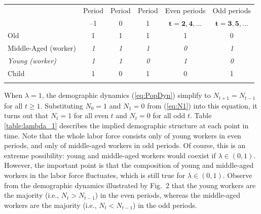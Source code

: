 \documentclass[nogrid]{MBE}%
\begin{document}
{\begin{table}[!t]
{\tabcolsep=0pt\begin{tabular*}{\textwidth}{@{\extracolsep{\fill}}lccccc@{}}\toprule
& Period  & Period &  Period &  Even periods  &  Odd periods\\
& --1 &  0  &  1  & $\boldsymbol{t=2,4,\dots}$ & $\boldsymbol{t=3,5,\dots}$\\\colrule
 Old & 1 & 1 & 1 & 1 & 0\\[.1pt]
 Middle-Aged (worker) & \textit{1} & \textit{1} & \textit{1} &
\textit{0} & \textit{1}\\
\textit{Young (worker)} & \textit{1} & \textit{1} & \textit{0} & \textit{1} &
\textit{0}\\
Child & 1 & 0 & 1 & 0 & 1\\\botrule
\end{tabular*}}
{}
\end{table}

When $\lambda=1$, the demographic dynamics (\ref{eq:PopDyn}) simplify to $N_{t+1}=N_{t-1}$ for all
$t \geq1$. Substituting $N_{0}=1$ and $N_{1}=0$ from (\ref{eq:N1}) into this equation, it turns
out that $N_{t}=1$ for all even $t$ and $N_{t}=0$ for all odd $t$. Table \ref{table:lambda_1}
describes the implied demographic structure at each point in time. Note that the whole labor force
consists only of young workers in even periods, and only of middle-aged workers in odd periods.
{Of course, this is an extreme possibility: young and middle-aged workers would coexist if
$\lambda\in\left(  0,1\right) $. However, the important point is that the composition of young and
middle-aged workers in the labor force fluctuates, which is still true for $\lambda\in(0,1)$.
Observe from the demographic dynamics illustrated by Fig.~2 that the young workers are the
majority (i.e., $N_{t}>N_{t-1}$) in the even periods, whereas the middle-aged workers are the
majority (i.e., $N_{t}<N_{t-1}$) in the odd periods.}

}
\end{document}
